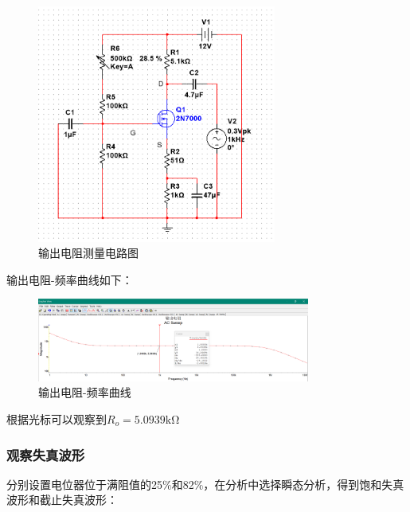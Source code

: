 \documentclass[a4paper,11pt,UTF8]{article}
\numberwithin{equation}{subsection}
\begin{document}
\begin{figure}[H]
	\centering
	\includegraphics[width=0.7\textwidth]{2.9.png}	
	\caption{输出电阻测量电路图}
\end{figure}

输出电阻-频率曲线如下：

\begin{figure}[H]
	\centering
	\includegraphics[width=0.8\textwidth]{2.10.png}	
	\caption{输出电阻-频率曲线}
\end{figure}

根据光标可以观察到$R_o=5.0939\mathrm{k\Omega}$

\subsubsection{观察失真波形}
分别设置电位器位于满阻值的25$\%$和82$\%$，在分析中选择瞬态分析，得到饱和失真波形和截止失真波形：

\begin{figure}[H]
\end{figure}
\end{document}
